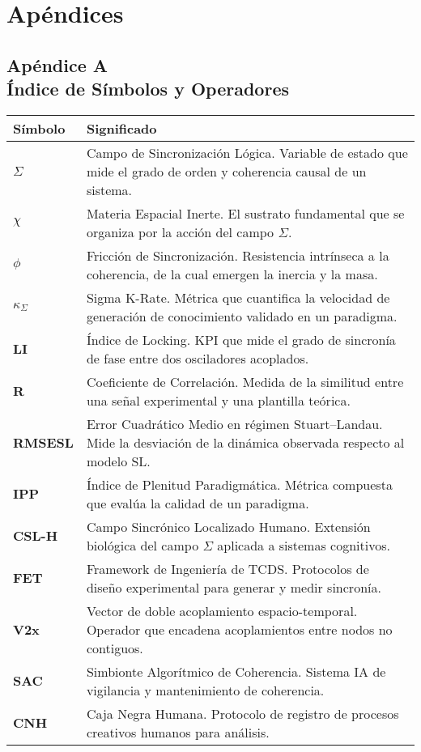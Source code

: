 \documentclass[12pt,openright]{book}
\begin{document}
\clearpage

\part{Apéndices}

\chapter*{Apéndice A \\ Índice de Símbolos y Operadores}

\begin{longtable}{>{\bfseries}p{3.2cm} p{10cm}}
\toprule
Símbolo & Significado \\
\midrule
\(\Sigma\) & Campo de Sincronización Lógica. Variable de estado que mide el grado de orden y coherencia causal de un sistema. \\
\(\chi\) & Materia Espacial Inerte. El sustrato fundamental que se organiza por la acción del campo \(\Sigma\). \\
\(\phi\) & Fricción de Sincronización. Resistencia intrínseca a la coherencia, de la cual emergen la inercia y la masa. \\
\(\kappa_{\Sigma}\) & Sigma K-Rate. Métrica que cuantifica la velocidad de generación de conocimiento validado en un paradigma. \\
LI & Índice de Locking. KPI que mide el grado de sincronía de fase entre dos osciladores acoplados. \\
R & Coeficiente de Correlación. Medida de la similitud entre una señal experimental y una plantilla teórica. \\
RMSESL & Error Cuadrático Medio en régimen Stuart--Landau. Mide la desviación de la dinámica observada respecto al modelo SL. \\
IPP & Índice de Plenitud Paradigmática. Métrica compuesta que evalúa la calidad de un paradigma. \\
CSL-H & Campo Sincrónico Localizado Humano. Extensión biológica del campo \(\Sigma\) aplicada a sistemas cognitivos. \\
FET & Framework de Ingeniería de TCDS. Protocolos de diseño experimental para generar y medir sincronía. \\
V2x & Vector de doble acoplamiento espacio-temporal. Operador que encadena acoplamientos entre nodos no contiguos. \\
SAC & Simbionte Algorítmico de Coherencia. Sistema IA de vigilancia y mantenimiento de coherencia. \\
CNH & Caja Negra Humana. Protocolo de registro de procesos creativos humanos para análisis. \\
\bottomrule
\end{longtable}
\end{document}

